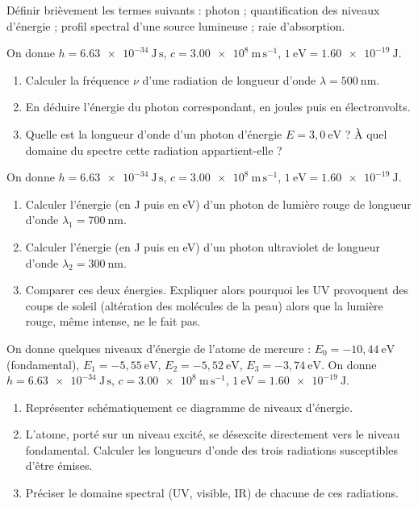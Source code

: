\documentclass[11pt]{article}
\newcommand{\cle}[1]{{\popxbold\color{popdark}#1}}
\newcounter{popsec}
\newcounter{popsub}
\newcommand{\courssub}[1]{%
  \stepcounter{popsub}%
  \par\vspace{9pt}\noindent{\popxbold\fontsize{11.5}{13}\selectfont\color{popink}{\color{poporange}\thepopsec.\thepopsub}\hspace{6pt}#1}\par\nopagebreak\vspace{4pt}
}
\begin{document}
\begin{exercice}[Définitions]
Définir brièvement les termes suivants : \cle{photon} ; \cle{quantification} des niveaux d'énergie ; \cle{profil spectral} d'une source lumineuse ; \cle{raie d'absorption}.
\end{exercice}

\begin{exercice}
On donne $h = \num{6,63e-34}\ \mathrm{J\,s}$, $c = \num{3,00e8}\ \mathrm{m\,s^{-1}}$, $1\ \mathrm{eV} = \num{1,60e-19}\ \mathrm{J}$.
\begin{enumerate}
\item Calculer la fréquence $\nu$ d'une radiation de longueur d'onde $\lambda = 500\ \mathrm{nm}$.
\item En déduire l'énergie du photon correspondant, en joules puis en électronvolts.
\item Quelle est la longueur d'onde d'un photon d'énergie $E = 3{,}0\ \mathrm{eV}$ ? À quel domaine du spectre cette radiation appartient-elle ?
\end{enumerate}
\end{exercice}

\courssub{Je m'entraîne}

\begin{exercice}
On donne $h = \num{6,63e-34}\ \mathrm{J\,s}$, $c = \num{3,00e8}\ \mathrm{m\,s^{-1}}$, $1\ \mathrm{eV} = \num{1,60e-19}\ \mathrm{J}$.
\begin{enumerate}
\item Calculer l'énergie (en J puis en eV) d'un photon de lumière rouge de longueur d'onde $\lambda_1 = 700\ \mathrm{nm}$.
\item Calculer l'énergie (en J puis en eV) d'un photon ultraviolet de longueur d'onde $\lambda_2 = 300\ \mathrm{nm}$.
\item Comparer ces deux énergies. Expliquer alors pourquoi les UV provoquent des coups de soleil (altération des molécules de la peau) alors que la lumière rouge, même intense, ne le fait pas.
\end{enumerate}
\end{exercice}

\begin{exercice}
On donne quelques niveaux d'énergie de l'atome de mercure : $E_0 = -10{,}44\ \mathrm{eV}$ (fondamental), $E_1 = -5{,}55\ \mathrm{eV}$, $E_2 = -5{,}52\ \mathrm{eV}$, $E_3 = -3{,}74\ \mathrm{eV}$. On donne $h = \num{6,63e-34}\ \mathrm{J\,s}$, $c = \num{3,00e8}\ \mathrm{m\,s^{-1}}$, $1\ \mathrm{eV} = \num{1,60e-19}\ \mathrm{J}$.
\begin{enumerate}
\item Représenter schématiquement ce diagramme de niveaux d'énergie.
\item L'atome, porté sur un niveau excité, se désexcite directement vers le niveau fondamental. Calculer les longueurs d'onde des trois radiations susceptibles d'être émises.
\item Préciser le domaine spectral (UV, visible, IR) de chacune de ces radiations.
\end{enumerate}
\end{exercice}
\end{document}

